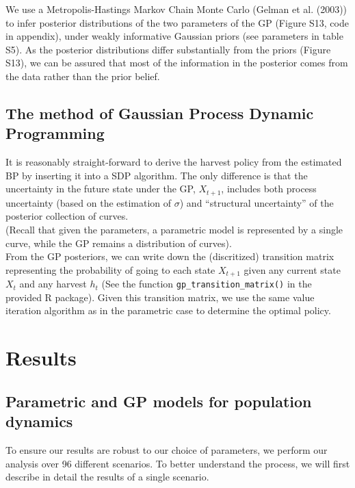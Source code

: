 \documentclass[author-year, 12pt,review]{elsarticle} %
\begin{document}
We use a Metropolis-Hastings Markov Chain Monte Carlo (Gelman et al.
(2003)) to infer posterior distributions of the two parameters of the GP
(Figure S13, code in appendix), under weakly informative Gaussian priors
(see parameters in table S5). As the posterior distributions differ
substantially from the priors (Figure S13), we can be assured that most
of the information in the posterior comes from the data rather than the
prior belief.

\subsection{The method of Gaussian Process Dynamic
Programming}\label{the-method-of-gaussian-process-dynamic-programming}

It is reasonably straight-forward to derive the harvest policy from the
estimated BP by inserting it into a SDP algorithm. The only difference
is that the uncertainty in the future state under the GP, $X_{t+1}$,
includes both process uncertainty (based on the estimation of $\sigma$)
and ``structural uncertainty'' of the posterior collection of
curves.\\(Recall that given the parameters, a parametric model is
represented by a single curve, while the GP remains a distribution of
curves).\\From the GP posteriors, we can write down the (discritized)
transition matrix representing the probability of going to each state
$X_{t+1}$ given any current state $X_t$ and any harvest $h_t$ (See the
function \texttt{gp\_transition\_matrix()} in the provided R package).
Given this transition matrix, we use the same value iteration algorithm
as in the parametric case to determine the optimal policy.

\section{Results}\label{results}

\subsection{Parametric and GP models for population
dynamics}\label{parametric-and-gp-models-for-population-dynamics}

To ensure our results are robust to our choice of parameters, we perform
our analysis over 96 different scenarios. To better understand the
process, we will first describe in detail the results of a single
scenario.
\end{document}
